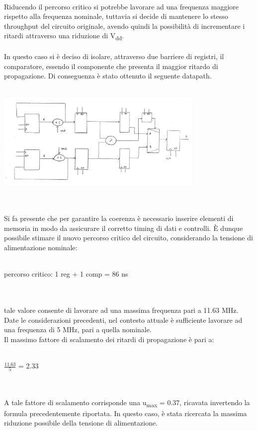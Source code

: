 \documentclass[11pt,  english, makeidx, a4paper, titlepage, oneside]{book}
\begin{document}
\\
Riducendo il percorso critico si potrebbe lavorare ad una frequenza maggiore rispetto alla frequenza nominale, tuttavia si decide di mantenere lo stesso throughput del circuito originale, avendo quindi la possibilità di incrementare i ritardi attraverso una riduzione di V\textsubscript{dd}.
\\\\
In questo caso si è deciso di isolare, attraverso due barriere di registri, il comparatore, essendo il componente che presenta il maggior ritardo di propagazione. Di conseguenza è stato ottenuto il seguente datapath.
\\\\
\centerline{\includegraphics[width=10cm]{./img/Lab_3/datapath_pipeline.jpeg}}
\\\\
Si fa presente che per garantire la coerenza è necessario inserire elementi di memoria in modo da assicurare il corretto timing di dati e controlli.
È dunque possibile stimare il nuovo percorso critico del circuito, considerando la tensione di alimentazione nominale:
\\\\
\centerline{percorso critico: 1 reg + 1 comp = 86 ns}
\\\\
tale valore consente di lavorare ad una massima frequenza pari  a 11.63 MHz. Date le considerazioni precedenti, nel contesto attuale è sufficiente lavorare ad una frequenza di 5 MHz, pari a quella nominale.
\\
Il massimo fattore di scalamento dei ritardi di propagazione è pari a:
\\\\
\centerline{$\frac{11.63}{5}$ = 2.33}
\\\\
A tale fattore di scalamento corrisponde una u\textsubscript{max} = 0.37, ricavata invertendo la formula precedentemente riportata. In questo caso, è stata ricercata la massima riduzione possibile della tensione di alimentazione.
\end{document}

